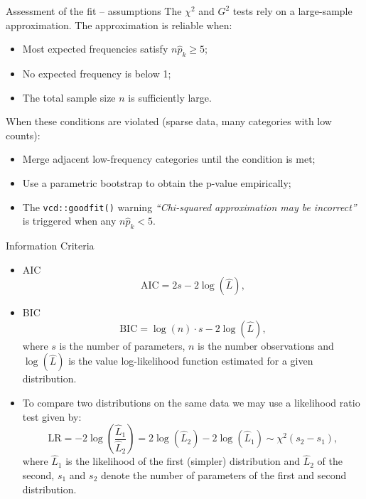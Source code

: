 \documentclass[10pt,ignorenonframetext,aspectratio=169]{beamer}
\begin{document}
\begin{frame}{Assessment of the fit -- assumptions}
    The $\chi^2$ and $G^2$ tests rely on a large-sample approximation. The approximation is reliable when:
    \begin{itemize}
        \item Most expected frequencies satisfy $n\hat{p}_k \geq 5$;
        \item No expected frequency is below 1;
        \item The total sample size $n$ is sufficiently large.
    \end{itemize}

    \vspace{0.3cm}
    When these conditions are violated (sparse data, many categories with low counts):
    \begin{itemize}
        \item Merge adjacent low-frequency categories until the condition is met;
        \item Use a parametric bootstrap to obtain the p-value empirically;
        \item The \texttt{vcd::goodfit()} warning \textit{``Chi-squared approximation may be incorrect''} is triggered when any $n\hat{p}_k < 5$.
    \end{itemize}
\end{frame}

\begin{frame}{Information Criteria}
    \begin{itemize}
        \item AIC
        $$
        \text{AIC} = 2s - 2\log(\hat{L}),
        $$
        \item BIC
        $$
        \text{BIC} = \log(n) \cdot s - 2\log(\hat{L}),
        $$
         where $s$ is the number of parameters, $n$ is the number observations and $\log(\hat{L})$ is the value log-likelihood function estimated for a given distribution.
         \item To compare two distributions on the same data we may use a likelihood ratio test given by:
         $$
         \text{LR} = -2\log\left(\frac{\hat{L}_1}{\hat{L}_2}\right) = 2\log(\hat{L}_2) - 2\log(\hat{L}_1) \sim \chi^2(s_2-s_1),
         $$
         where $\hat{L}_1$ is the likelihood of the first (simpler) distribution and $\hat{L}_2$ of the second, $s_1$ and $s_2$ denote the number of parameters of the first and second distribution.
    \end{itemize}


\end{frame}
\end{document}
